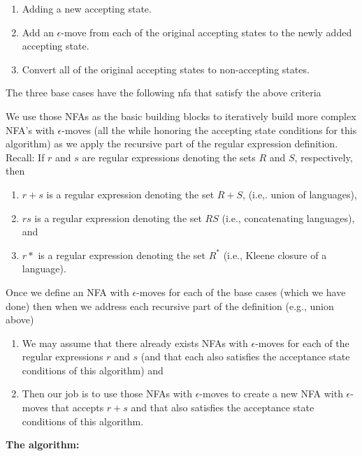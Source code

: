 \documentclass{report}
\begin{document}
\begin{itemize}
        \begin{enumerate}
            \item Adding a new accepting state.
            \item Add an $\epsilon$-move from each of the original accepting states to the newly added accepting state.
            \item Convert all of the original accepting states to non-accepting states.
        \end{enumerate}
        \bigbreak \noindent 
        The three base cases have the following nfa that satisfy the above criteria
        \bigbreak \noindent 
\begin{figure}[ht]
    \centering
    \label{fig:crit2}
\end{figure}
\bigbreak \noindent 
We use those NFAs as the basic building blocks to iteratively build more complex NFA’s with $\epsilon$-moves (all the while honoring the accepting state conditions for this algorithm) as we apply the recursive part of the regular expression definition. Recall:
\bigbreak \noindent 
If $r$ and $s$ are regular expressions denoting the sets $R$ and $S$, respectively, then
\begin{enumerate}
    \item $r+s$ is a regular expression denoting the set $R + S$, (i.e,. union of languages),
    \item $rs$ is a regular expression denoting the set $RS$ (i.e., concatenating languages), and
\item $r*$ is a regular expression denoting the set $R^{*}$ (i.e., Kleene closure of a language).
\end{enumerate}
\bigbreak \noindent 
Once we define an NFA with $\epsilon$-moves for each of the base cases (which we have done) then when we address each recursive part of the definition (e.g., union above)
\begin{enumerate}
    \item We may assume that there already exists NFAs with $\epsilon$-moves for each of the regular expressions $r$ and $s$ (and that each also satisfies the acceptance state conditions of this algorithm) and 
    \item Then our job is to use those NFAs with $\epsilon$-moves to create a new NFA with $\epsilon$-moves that accepts $r+s$ and that also satisfies the acceptance state conditions of this algorithm.
\end{enumerate}
\bigbreak \noindent 
\textbf{The algorithm:}
\begin{itemize}

\end{itemize}
\end{itemize}
\end{document}
